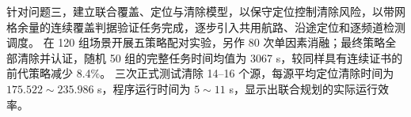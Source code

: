 {\heiti 针对问题三}\songti，建立{\heiti 联合覆盖、定位与清除模型}\songti，以保守定位控制清除风险，以带网格余量的连续覆盖判据验证任务完成，逐步引入共用航路、沿途定位和逐频道检测调度。
在 120 组场景开展五策略配对实验，另作 80 次单因素消融；最终策略全部清除并认证，随机 50 组的{\heiti 完整任务时间均值为 3067 s}\songti，较同样具有连续证书的前代策略减少 8.4\%。
三次正式测试清除 14--16 个源，{\heiti 每源平均定位清除时间为 $175.522\sim235.986$ s，程序运行时间为 $5\sim11$ s}\songti，显示出联合规划的实际运行效率。
